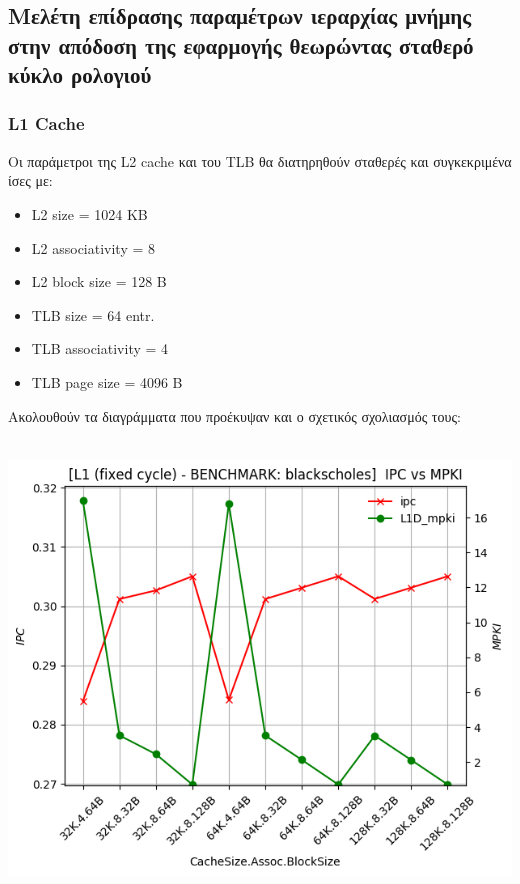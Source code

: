 \subsection{Μελέτη επίδρασης παραμέτρων ιεραρχίας μνήμης στην απόδοση της εφαρμογής θεωρώντας σταθερό κύκλο ρολογιού}
\vspace{3mm}

\subsubsection{L1 Cache}
Οι παράμετροι της \textlatin{L2 cache} και του \textlatin{TLB} θα διατηρηθούν
σταθερές και συγκεκριμένα ίσες με:


\begin{multicols}{2}
    \begin{itemize}
        \item L2 size = 1024 KB  
        \item L2 associativity = 8
        \item L2 block size = 128 B
        \item TLB size = 64 entr.
        \item TLB associativity = 4
        \item TLB page size = 4096 B
    \end{itemize}
\end{multicols}

Ακολουθούν τα διαγράμματα που προέκυψαν και ο σχετικός σχολιασμός τους:

\begin{minipage}{\textwidth}
    \begin{center}
        \\
        \vspace{3mm}
        \includegraphics[scale=0.70]{graphs/L1/fixed/blackscholes.png}
        \vspace{6mm}
    \end{center}
\end{minipage}


